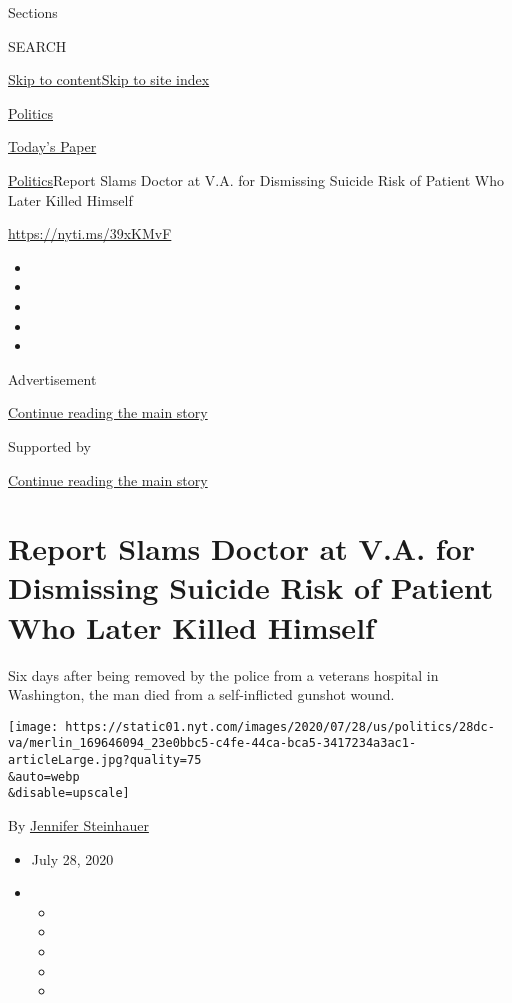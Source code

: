 Sections

SEARCH

\protect\hyperlink{site-content}{Skip to
content}\protect\hyperlink{site-index}{Skip to site index}

\href{https://www.nytimes.com/section/politics}{Politics}

\href{https://myaccount.nytimes.com/auth/login?response_type=cookie\&client_id=vi}{}

\href{https://www.nytimes.com/section/todayspaper}{Today's Paper}

\href{/section/politics}{Politics}\textbar{}Report Slams Doctor at V.A.
for Dismissing Suicide Risk of Patient Who Later Killed Himself

\url{https://nyti.ms/39xKMvF}

\begin{itemize}
\item
\item
\item
\item
\item
\end{itemize}

Advertisement

\protect\hyperlink{after-top}{Continue reading the main story}

Supported by

\protect\hyperlink{after-sponsor}{Continue reading the main story}

\hypertarget{report-slams-doctor-at-va-for-dismissing-suicide-risk-of-patient-who-later-killed-himself}{%
\section{Report Slams Doctor at V.A. for Dismissing Suicide Risk of
Patient Who Later Killed
Himself}\label{report-slams-doctor-at-va-for-dismissing-suicide-risk-of-patient-who-later-killed-himself}}

Six days after being removed by the police from a veterans hospital in
Washington, the man died from a self-inflicted gunshot wound.

\texttt{[image: https://static01.nyt.com/images/2020/07/28/us/politics/28dc-va/merlin\_169646094\_23e0bbc5-c4fe-44ca-bca5-3417234a3ac1-articleLarge.jpg?quality=75\\\&auto=webp\\\&disable=upscale]}

By \href{https://www.nytimes.com/by/jennifer-steinhauer}{Jennifer
Steinhauer}

\begin{itemize}
\item
  July 28, 2020
\item
  \begin{itemize}
  \item
  \item
  \item
  \item
  \item
  \end{itemize}
\end{itemize}

